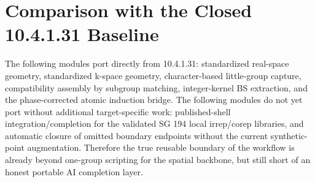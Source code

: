 \documentclass[11pt]{article}
\begin{document}
\section{Comparison with the Closed 10.4.1.31 Baseline}
The following modules port directly from 10.4.1.31: standardized real-space geometry, standardized k-space geometry, character-based little-group capture, compatibility assembly by subgroup matching, integer-kernel BS extraction, and the phase-corrected atomic induction bridge. The following modules do not yet port without additional target-specific work: published-shell integration/completion for the validated SG 194 local irrep/corep libraries, and automatic closure of omitted boundary endpoints without the current synthetic-point augmentation. Therefore the true reusable boundary of the workflow is already beyond one-group scripting for the spatial backbone, but still short of an honest portable AI completion layer.
\end{document}
